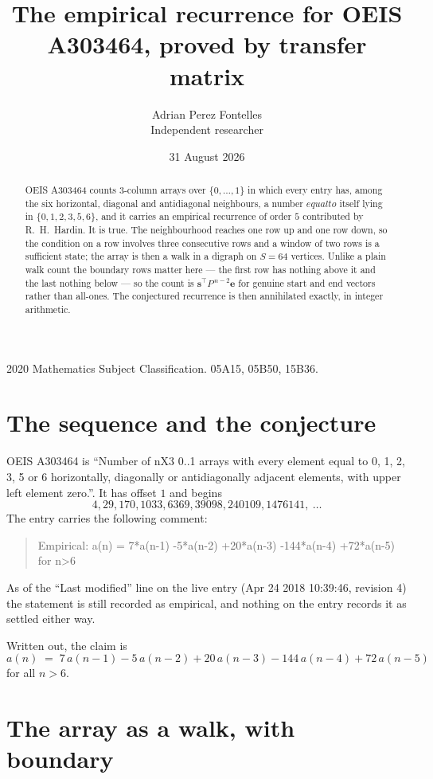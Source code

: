 \documentclass[11pt,a4paper]{article}
\title{The empirical recurrence for OEIS A303464, proved by transfer matrix}
\author{Adrian Perez Fontelles\\ \small Independent researcher}
\date{31 August 2026}
\theoremstyle{plain}
\theoremstyle{definition}
\begin{document}
\maketitle

\begin{abstract}
OEIS A303464 counts $3$-column arrays over $\{0,\dots,1\}$ in which every entry has,
among the six horizontal, diagonal and antidiagonal neighbours, a number $equal to$ itself lying in $\{0,1,2,3,5,6\}$, and it carries an empirical
recurrence of order $5$ contributed by R.~H.~Hardin. It is true. The neighbourhood
reaches one row up and one row down, so the condition on a row involves three consecutive
rows and a window of two rows is a sufficient state; the array is then a walk in a digraph
on $S=64$ vertices. Unlike a plain walk count the boundary rows matter here --- the first
row has nothing above it and the last nothing below --- so the count is
$\mathbf{s}^{\!\top}P^{\,n-2}\mathbf{e}$ for genuine start and end vectors rather than
all-ones. The conjectured recurrence is then annihilated exactly, in integer arithmetic.
\end{abstract}

\noindent\small 2020 Mathematics Subject Classification. 05A15, 05B50, 15B36.\normalsize

\section{The sequence and the conjecture}

OEIS A303464 is ``Number of nX3 0..1 arrays with every element equal to 0, 1, 2, 3, 5 or 6 horizontally, diagonally or antidiagonally adjacent elements, with upper left element zero.''. It has offset
$1$ and begins
\[
4, 29, 170, 1033, 6369, 39098, 240109, 1476141,\ \dots
\]
The entry carries the following comment:
\begin{quote}\small
Empirical: a(n) = 7*a(n-1) -5*a(n-2) +20*a(n-3) -144*a(n-4) +72*a(n-5) for n>6
\end{quote}
As of the ``Last modified'' line on the live entry (Apr 24 2018 10:39:46, revision
4) the statement is still recorded as empirical, and nothing on the entry
records it as settled either way.

Written out, the claim is
\begin{equation}\label{eq:conj}
a(n)\;=\;7\,a(n-1) - 5\,a(n-2) + 20\,a(n-3) - 144\,a(n-4) + 72\,a(n-5)
\end{equation}
for all $n>6$.

\section{The array as a walk, with boundary}
\end{document}
